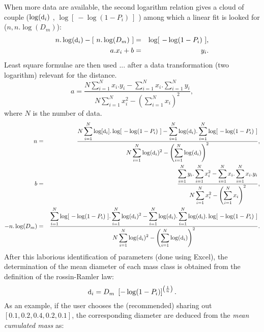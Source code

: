 When more data are available, the second logarithm relation gives a cloud of
couple ($\log(\mbox{\small d}_i)$ , $\log[~-\log(1-P_i)~]$ ) among which a
linear fit is looked for ($n, n.\log(D_m)$):
\begin{eqnarray}
  \displaystyle n . \log(\mbox{\small d}_i)- \left[~n.\log(D_m)~\right] &=& \log[~-\log(1-P_i)~], \label{eq:combustion:log_007}\\
  a.x_i + b &=& y_i. \nonumber
\end{eqnarray}
Least square formulae are then used ... after a data transformation (two
logarithm) relevant for the distance.
\begin{equation}
a = \frac{N \displaystyle \sum_{i=1}^N x_i.y_i - \sum_{i=1}^N x_i . \sum_{i=1}^N y_i}{N \displaystyle \sum_{i=1}^N x_i^2 - \left( \sum_{i=1}^N x_i\right)^2}, \label{eq:combustion:log_008}
\end{equation}
where $N$ is the number of data.
\begin{eqnarray*}
n &=&
\dfrac{
  N \displaystyle \sum_{i=1}^N \log[\mbox{\small d}_i].\log[~-\log(1-P_i)~] - \sum_{i=1}^N \log(\mbox{\small d}_i) . \sum_{i=1}^N \log[~-\log(1-P_i)~]
}{
  N\displaystyle \sum_{i=1}^N \log(\mbox{\small d}_i)^2 - \left( \sum_{i=1}^N \log(\mbox{\small d}_i)\right)^2
},  \\
b &=&
\dfrac{
  \displaystyle \sum_{i=1}^N y_i . \sum_{i=1}^N x_i^2 - \sum_{i=1}^N x_i . \sum_{i=1}^N x_i.y_i
}{
  N \displaystyle \sum_{i=1}^N x_i^2 - \left( \sum_{i=1}^N x_i\right)^2
},  \\
-n.\log(D_m) &=&
\dfrac{
  \displaystyle \sum_{i=1}^N \log[~-\log(1-P_i)~] . \sum_{i=1}^N \log(\mbox{\small d}_i)^2 - \sum_{i=1}^N \log(\mbox{\small d}_i) . \sum_{i=1}^N \log(\mbox{\small d}_i).\log[~-\log(1-P_i)~]
}{
  N \displaystyle \sum_{i=1}^N \log(\mbox{\small d}_i)^2 - \left( \sum_{i=1}^N \log(\mbox{\small d}_i)\right)^2
}.
\end{eqnarray*}
After this laborious identification of parameters (done using Excel), the
determination of the mean diameter of each mass class is obtained from the
definition of the rossin-Ramler law:
\begin{equation}
 \mbox{\small d}_i = D_m ~ \left[-\log(1-P_i) \right]^{\left(\frac{1}{n} \right)}. \label{eq:combustion:log_012}
\end{equation}
As an example, if the user chooses the (recommended) sharing out $\left[0.1 , 0.2 , 0.4 , 0.2, 0.1 \right]$, the corresponding diameter are deduced from the \textit{mean cumulated mass} as:
